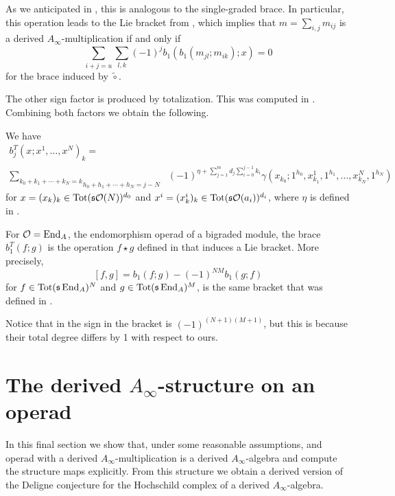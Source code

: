 \documentclass[Thesis.tex]{subfiles}
\begin{document}
\begin{remark}
 As we anticipated in , this is analogous to the single-graded brace. In particular, this operation leads to the Lie bracket from \cite{RW}, which implies that $m=\sum_{i,j}m_{ij}$ is a derived $A_\infty$-multiplication if and only if
\begin{equation}\label{sharp}
\sum_{i+j=u}\sum_{l,k}(-1)^jb_1(b_1(m_{jl};m_{ik});x)=0
\end{equation}
for the brace induced by $\tilde{\circ}$. 
\end{remark}
The other sign factor is produced by totalization. This was computed in . Combining both factors we obtain the following.

\begin{lem}
We have 
\begin{align}\label{bracetot}
b_j^T(x;x^1,\dots, x^N)_k=&\\
\underset{h_0+h_1+\cdots+h_N=j-N}{\sum_{k_0+k_1+\cdots+k_N=k}}&(-1)^{\eta+\sum_{j=1}^m d_j\sum_{i=0}^{j-1}k_i}\gamma(x_{k_0};1^{h_0},x^1_{k_1},1^{h_1},\dots, x^N_{k_N},1^{h_N})\nonumber
\end{align}
for $x=(x_k)_k\in\operatorname{Tot}(\mathfrak{s}{\mathcal O}(N))^{d_0}$ and $x^i=(x^i_k)_k\in\operatorname{Tot}(\mathfrak{s}{\mathcal O}(a_i))^{d_i}$, where $\eta$ is defined in . 
\end{lem}

\begin{corollary}\label{biliebracket}
 For ${\mathcal O} = \operatorname{End}_A$, the endomorphism operad of a bigraded module, the brace $b_1^T(f;g)$ is the operation $f\star g$ defined in \cite{LRW} that induces a Lie bracket. More precisely,
\[
[f,g]=b_1(f;g)-(-1)^{NM}b_1(g;f)
\]
for $f\in\operatorname{Tot}(\mathfrak{s}\operatorname{End}_A)^N$ and $g\in\operatorname{Tot}(\mathfrak{s}\operatorname{End}_A)^M$, is the same bracket that was defined in \cite{LRW}. 
\end{corollary}

Notice that in \cite{LRW} the sign in the bracket is $(-1)^{(N+1)(M+1)}$, but this is because their total degree differs by 1 with respect to ours.

\section{The derived $A_\infty$-structure on an operad}\label{derivedstructure}


In this final section we show that, under some reasonable assumptions, and operad with a derived $A_\infty$-multiplication is a derived $A_\infty$-algebra and compute the structure maps explicitly. From this structure we obtain a derived version of the Deligne conjecture for the Hochschild complex of a derived $A_\infty$-algebra.
\end{document}
